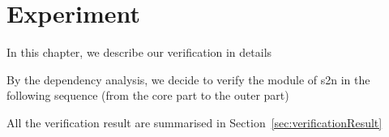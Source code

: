 \chapter{Experiment} \label{chpt:verification}

In this chapter, we describe our verification in details 

By the dependency analysis, we decide to verify the module of s2n in the following sequence (from the core part to the outer part)

All the verification result are summarised in Section~\ref{sec:verificationResult}







